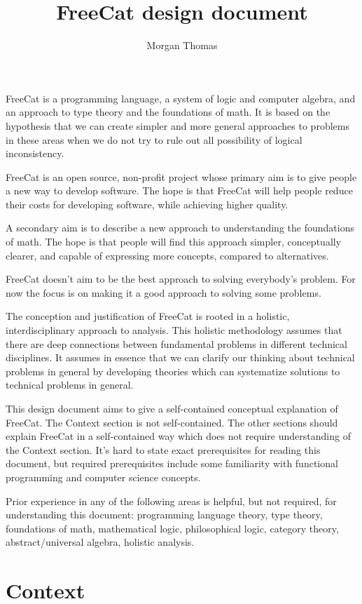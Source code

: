 \documentclass{article}
\title{FreeCat design document}
\author{Morgan Thomas}
\begin{document}
\maketitle

FreeCat is a programming language, a system of logic and computer algebra, and an approach to type theory and the foundations of math. It is based on the hypothesis that we can create simpler and more general approaches to problems in these areas when we do not try to rule out all possibility of logical inconsistency.

FreeCat is an open source, non-profit project whose primary aim is to give people a new way to develop software. The hope is that FreeCat will help people reduce their costs for developing software, while achieving higher quality.

A secondary aim is to describe a new approach to understanding the foundations of math. The hope is that people will find this approach simpler, conceptually clearer, and capable of expressing more concepts, compared to alternatives.

FreeCat doesn't aim to be the best approach to solving everybody's problem. For now the focus is on making it a good approach to solving some problems.

The conception and justification of FreeCat is rooted in a holistic, interdisciplinary approach to analysis. This holistic methodology assumes that there are deep connections between fundamental problems in different technical disciplines. It assumes in essence that we can clarify our thinking about technical problems in general by developing theories which can systematize solutions to technical problems in general.

This design document aims to give a self-contained conceptual explanation of FreeCat. The Context section is not self-contained. The other sections should explain FreeCat in a self-contained way which does not require understanding of the Context section. It's hard to state exact prerequisites for reading this document, but required prerequisites include some familiarity with functional programming and computer science concepts.

Prior experience in any of the following areas is helpful, but not required, for understanding this document: programming language theory, type theory, foundations of math, mathematical logic, philosophical logic, category theory, abstract/universal algebra, holistic analysis.

\section{Context}
\end{document}

